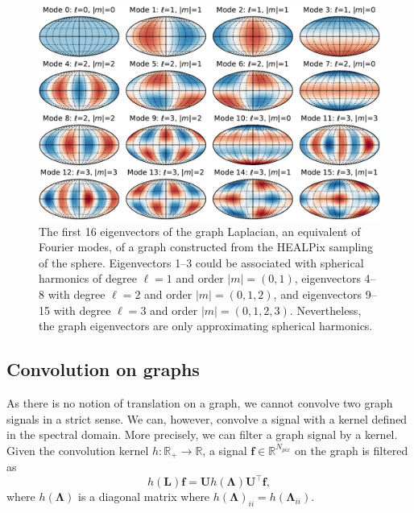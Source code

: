 \documentclass[final,twocolumn,3p,times,sort&compress]{elsarticle}
\renewcommand{\b}[1]{{\bm{#1}}}   %
\newcommand{\1}{\b{1}}              %
\newcommand{\0}{\b{0}}              %
\renewcommand{\L}{\b{L}}
\newcommand{\U}{\b{U}}
\newcommand{\f}{\b{f}}
\newcommand{\trans}{^\intercal}
\newcommand{\R}{\mathbb{R}}
\newcommand{\bLambda}{\b{\Lambda}}
\begin{document}
\begin{figure}[t!]
	\centering
	\includegraphics[width=\linewidth]{eigenvectors}
	\caption{The first 16 eigenvectors of the graph Laplacian, an equivalent of Fourier modes, of a graph constructed from the HEALPix sampling of the sphere.
    Eigenvectors 1--3 could be associated with spherical harmonics of degree $\ell=1$ and order $|m|=(0,1)$, eigenvectors 4--8 with degree $\ell=2$ and order $|m|=(0,1,2)$, and eigenvectors 9--15 with degree $\ell=3$ and order $|m|=(0,1,2,3)$.
    Nevertheless, the graph eigenvectors are only approximating spherical harmonics.}
	\label{fig:graph_harmonics}
\end{figure}

\subsection{Convolution on graphs}
\label{sec:graph_convolution}


As there is no notion of translation on a graph, we cannot convolve two graph signals in a strict sense.
We can, however, convolve a signal with a kernel defined in the spectral domain.
More precisely, we can filter a graph signal by a kernel.
Given the convolution kernel
$h: \R_+ \rightarrow \R$, a signal $\f \in \R^{N_{pix}}$ on the graph is filtered as
\begin{equation} \label{eqn:graph_convolution_fourier}
	h(\L) \f = \U h(\bLambda) \U\trans \f,
\end{equation}
where $h(\bLambda)$ is a diagonal matrix where $h(\bLambda)_{ii} = h(\bLambda_{ii})$.
\end{document}
